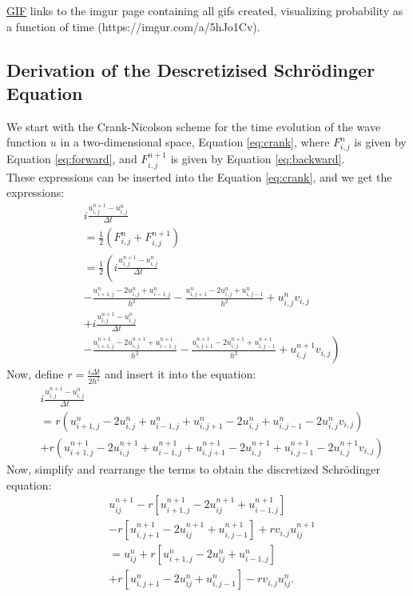 \documentclass[10pt, nofootinbib, twocolumn]{revtex4-1}
\begin{document}
\href{https://imgur.com/a/5hJo1Cv}{GIF} links to the imgur page containing all gifs created, visualizing  probability as a function of time (https://imgur.com/a/5hJo1Cv).

\newpage
\subsection{Derivation of the Descretizised Schrödinger Equation}\label{sec:derivation}
We start with the Crank-Nicolson scheme for the time evolution of the wave function \(u\) in a two-dimensional space, Equation \eqref{eq:crank}, where \(F_{i,j}^n\) is given by Equation \eqref{eq:forward}, and \(F_{i,j}^{n+1}\) is given by Equation \eqref{eq:backward}. \\
These expressions can be inserted into the Equation \eqref{eq:crank}, and we get the expressions:
\[
\begin{aligned}
    &i \frac{u^{n+1}_{i,j}-u^{n}_{i,j}}{\Delta t} \\
    &= \frac{1}{2}(F_{i,j}^{n}+F_{i,j}^{n+1})\\
    &=\frac{1}{2}\left(i \frac{u^{n+1}_{i,j}-u^{n}_{i,j}}{\Delta t} \right. \\
    &- \left.\frac{u^n_{i+1,j}-2u^n_{i,j}+u^n_{i-1,j}}{h^2} - \frac{u^n_{i,j+1}-2u^n_{i,j}+u^n_{i,j-1} }{h^2} + u^n_{i,j}v_{i,j}\right.\\
    &+ \left.i \frac{u^{n+1}_{i,j}-u^{n}_{i,j}}{\Delta t} \right. \\
    &- \left.\frac{u^{n+1}_{i+1,j}- 2u^{n+1}_{i,j}+u^{n+1}_{i-1,j}}{h^2} - \frac{u^{n+1}_{i,j+1}-2u^{n+1}_{i,j}+u^{n+1}_{i,j-1} }{h^2} + u^{n+1}_{i,j}v_{i,j}\right)
\end{aligned}
\]
Now, define \(r = \frac{i \Delta t}{2h^2}\) and insert it into the equation:
\[
\begin{aligned}
    &i \frac{u^{n+1}_{i,j}-u^{n}_{i,j}}{\Delta t} \\
    &= r\left(u^n_{i+1,j}-2u^n_{i,j}+u^n_{i-1,j} + u^n_{i,j+1}-2u^n_{i,j}+u^n_{i,j-1} - 2u^n_{i,j}v_{i,j}\right)\\
    &+ r\left(u^{n+1}_{i+1,j}-2u^{n+1}_{i,j}+u^{n+1}_{i-1,j} + u^{n+1}_{i,j+1}-2u^{n+1}_{i,j}+u^{n+1}_{i,j-1} - 2u^{n+1}_{i,j}v_{i,j}\right)
\end{aligned}
\]
Now, simplify and rearrange the terms to obtain the discretized Schrödinger equation:
\[
\begin{aligned}
    &u_{ij}^{n+1} - r\left[u_{i+1,j}^{n+1} - 2u_{ij}^{n+1} + u_{i-1,j}^{n+1}\right] \\
    &- r\left[u_{i,j+1}^{n+1} - 2u_{ij}^{n+1} + u_{i,j-1}^{n+1}\right] + r v_{i,j} u_{ij}^{n+1} \\
    &= u_{ij}^n + r\left[u_{i+1,j}^n - 2u_{ij}^n + u_{i-1,j}^n\right] \\
    &+ r\left[u_{i,j+1}^n - 2u_{ij}^n + u_{i,j-1}^n\right] - r v_{i,j} u_{ij}^n.
\end{aligned}
\]
\vspace*{100\baselineskip}
\end{document}
